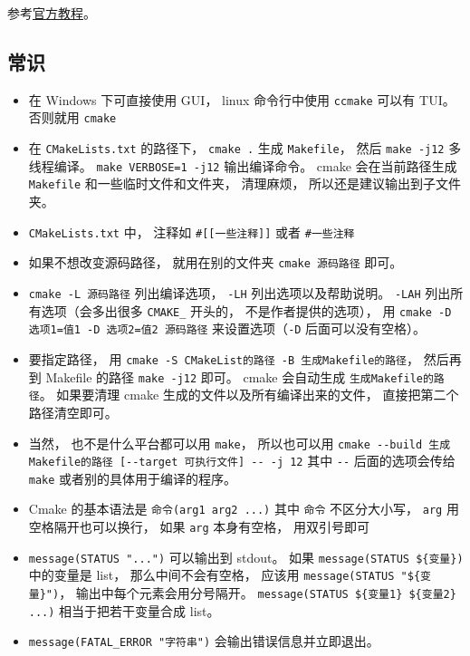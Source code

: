 


参考\href{https://cmake.org/cmake/help/latest/guide/tutorial/index.html}{官方教程}。

\subsection{常识}
\begin{itemize}
\item 在 Windows 下可直接使用 GUI， linux 命令行中使用 \verb`ccmake` 可以有 TUI。 否则就用 \verb`cmake`
\item 在 \verb|CMakeLists.txt| 的路径下， \verb`cmake .` 生成 \verb|Makefile|， 然后 \verb|make -j12| 多线程编译。 \verb|make VERBOSE=1 -j12| 输出编译命令。 cmake 会在当前路径生成 \verb|Makefile| 和一些临时文件和文件夹， 清理麻烦， 所以还是建议输出到子文件夹。
\item \verb|CMakeLists.txt| 中， 注释如 \verb|#[[一些注释]]| 或者 \verb|#一些注释|
\item 如果不想改变源码路径， 就用在别的文件夹 \verb|cmake 源码路径| 即可。
\item \verb|cmake -L 源码路径| 列出编译选项， \verb|-LH| 列出选项以及帮助说明。 \verb|-LAH| 列出所有选项（会多出很多 \verb|CMAKE_| 开头的， 不是作者提供的选项）， 用 \verb|cmake -D 选项1=值1 -D 选项2=值2 源码路径| 来设置选项（\verb|-D| 后面可以没有空格）。
\item 要指定路径， 用 \verb|cmake -S CMakeList的路径 -B 生成Makefile的路径|， 然后再到 Makefile 的路径 \verb|make -j12| 即可。 cmake 会自动生成 \verb|生成Makefile的路径|。 如果要清理 cmake 生成的文件以及所有编译出来的文件， 直接把第二个路径清空即可。
\item 当然， 也不是什么平台都可以用 \verb|make|， 所以也可以用 \verb|cmake --build 生成Makefile的路径 [--target 可执行文件] -- -j 12| 其中 \verb|--| 后面的选项会传给 \verb|make| 或者别的具体用于编译的程序。
\item Cmake 的基本语法是 \verb`命令(arg1 arg2 ...)` 其中 \verb|命令| 不区分大小写， \verb`arg` 用空格隔开也可以换行， 如果 \verb|arg| 本身有空格， 用双引号即可
\item \verb`message(STATUS "...")` 可以输出到 stdout。 如果 \verb`message(STATUS ${变量})` 中的变量是 list， 那么中间不会有空格， 应该用 \verb`message(STATUS "${变量}")`， 输出中每个元素会用分号隔开。 \verb`message(STATUS ${变量1} ${变量2} ...)` 相当于把若干变量合成 list。
\item \verb|message(FATAL_ERROR "字符串")| 会输出错误信息并立即退出。

\end{itemize}
